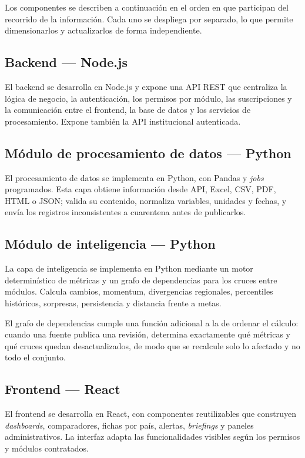 \documentclass[11pt,a4paper]{article}
\begin{document}
Los componentes se describen a continuaci\'on en el orden en que participan del
recorrido de la informaci\'on. Cada uno se despliega por separado, lo que
permite dimensionarlos y actualizarlos de forma independiente.

\subsection{Backend --- Node.js}

El backend se desarrolla en Node.js y expone una API REST que centraliza la
l\'ogica de negocio, la autenticaci\'on, los permisos por m\'odulo, las
suscripciones y la comunicaci\'on entre el frontend, la base de datos y los
servicios de procesamiento. Expone tambi\'en la API institucional autenticada.

\subsection{M\'odulo de procesamiento de datos --- Python}

El procesamiento de datos se implementa en Python, con Pandas y \emph{jobs}
programados. Esta capa obtiene informaci\'on desde API, Excel, CSV, PDF, HTML o
JSON; valida su contenido, normaliza variables, unidades y fechas, y env\'ia los
registros inconsistentes a cuarentena antes de publicarlos.

\subsection{M\'odulo de inteligencia --- Python}

La capa de inteligencia se implementa en Python mediante un motor
determin\'istico de m\'etricas y un grafo de dependencias para los cruces entre
m\'odulos. Calcula cambios, momentum, divergencias regionales, percentiles
hist\'oricos, sorpresas, persistencia y distancia frente a metas.

El grafo de dependencias cumple una funci\'on adicional a la de ordenar el
c\'alculo: cuando una fuente publica una revisi\'on, determina exactamente
qu\'e m\'etricas y qu\'e cruces quedan desactualizados, de modo que se
recalcule solo lo afectado y no todo el conjunto.

\subsection{Frontend --- React}

El frontend se desarrolla en React, con componentes reutilizables que construyen
\emph{dashboards}, comparadores, fichas por pa\'is, alertas, \emph{briefings} y
paneles administrativos. La interfaz adapta las funcionalidades visibles seg\'un
los permisos y m\'odulos contratados.
\end{document}
